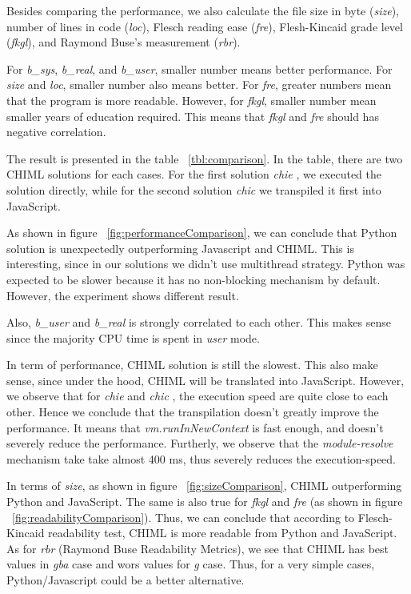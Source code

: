 \documentclass[conference]{IEEEtran}
\begin{document}
Besides comparing the performance, we also calculate the file size in byte ({\it size}), number of lines in code ({\it loc}), Flesch reading ease ({\it fre}), Flesh-Kincaid grade level ({\it fkgl}), and Raymond Buse's measurement ({\it rbr}).

For {\it b\_sys}, {\it b\_real}, and {\it b\_user}, smaller number means better performance. For {\it size} and {\it loc}, smaller number also means better. For {\it fre}, greater numbers mean that the program is more readable. However, for {\it fkgl}, smaller number mean smaller years of education required. This means that {\it fkgl} and {\it fre} should has negative correlation.

The result is presented in the table ~\ref{tbl:comparison}. In the table, there are two CHIML solutions for each cases. For the first solution  {\it chie }, we executed the solution directly, while for the second solution {\it chic } we transpiled it first into JavaScript.

As shown in figure ~\ref{fig:performanceComparison}, we can conclude that Python solution is unexpectedly outperforming Javascript and CHIML. This is interesting, since in our solutions we didn't use multithread strategy. Python was expected to be slower because it has no non-blocking mechanism by default. However, the experiment shows different result.

Also, {\it b\_user} and {\it b\_real} is strongly correlated to each other. This makes sense since the majority CPU time is spent in {\it user} mode.

In term of performance, CHIML solution is still the slowest. This also make sense, since under the hood, CHIML will be translated into JavaScript. However, we observe that for {\it chie } and {\it chic }, the execution speed are quite close to each other. Hence we conclude that the transpilation doesn't greatly improve the performance. It means that {\it vm.runInNewContext} is fast enough, and doesn't severely reduce the performance. Furtherly, we observe that the {\it module-resolve} mechanism take take almost 400 ms, thus severely reduces the execution-speed.

In terms of {\it size}, as shown in figure ~\ref{fig:sizeComparison}, CHIML outperforming Python and JavaScript. The same is also true for {\it fkgl} and {\it fre} (as shown in figure ~\ref{fig:readabilityComparison}). Thus, we can conclude that according to Flesch-Kincaid readability test, CHIML is more readable from Python and JavaScript. As for {\it rbr} (Raymond Buse Readability Metrics), we see that CHIML has best values in {\it gba} case and wors values for {\it g} case. Thus, for a very simple cases, Python/Javascript could be a better alternative.
\end{document}

